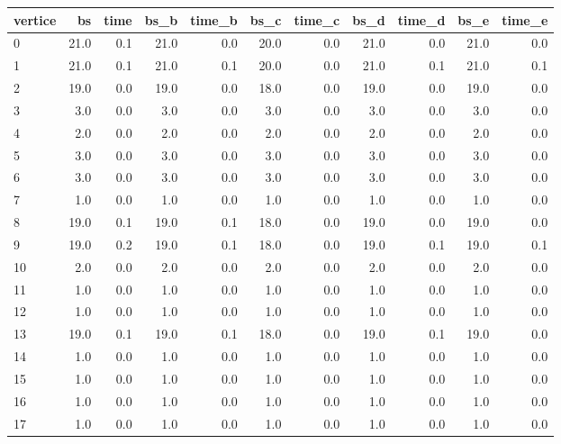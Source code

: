 \begin{tabular}{lrrrrrrrrrr}
\toprule
vertice &    bs &  time &  bs\_b &  time\_b &  bs\_c &  time\_c &  bs\_d &  time\_d &  bs\_e &  time\_e \\
\midrule
      0 &  21.0 &   0.1 &  21.0 &     0.0 &  20.0 &     0.0 &  21.0 &     0.0 &  21.0 &     0.0 \\
      1 &  21.0 &   0.1 &  21.0 &     0.1 &  20.0 &     0.0 &  21.0 &     0.1 &  21.0 &     0.1 \\
      2 &  19.0 &   0.0 &  19.0 &     0.0 &  18.0 &     0.0 &  19.0 &     0.0 &  19.0 &     0.0 \\
      3 &   3.0 &   0.0 &   3.0 &     0.0 &   3.0 &     0.0 &   3.0 &     0.0 &   3.0 &     0.0 \\
      4 &   2.0 &   0.0 &   2.0 &     0.0 &   2.0 &     0.0 &   2.0 &     0.0 &   2.0 &     0.0 \\
      5 &   3.0 &   0.0 &   3.0 &     0.0 &   3.0 &     0.0 &   3.0 &     0.0 &   3.0 &     0.0 \\
      6 &   3.0 &   0.0 &   3.0 &     0.0 &   3.0 &     0.0 &   3.0 &     0.0 &   3.0 &     0.0 \\
      7 &   1.0 &   0.0 &   1.0 &     0.0 &   1.0 &     0.0 &   1.0 &     0.0 &   1.0 &     0.0 \\
      8 &  19.0 &   0.1 &  19.0 &     0.1 &  18.0 &     0.0 &  19.0 &     0.0 &  19.0 &     0.0 \\
      9 &  19.0 &   0.2 &  19.0 &     0.1 &  18.0 &     0.0 &  19.0 &     0.1 &  19.0 &     0.1 \\
     10 &   2.0 &   0.0 &   2.0 &     0.0 &   2.0 &     0.0 &   2.0 &     0.0 &   2.0 &     0.0 \\
     11 &   1.0 &   0.0 &   1.0 &     0.0 &   1.0 &     0.0 &   1.0 &     0.0 &   1.0 &     0.0 \\
     12 &   1.0 &   0.0 &   1.0 &     0.0 &   1.0 &     0.0 &   1.0 &     0.0 &   1.0 &     0.0 \\
     13 &  19.0 &   0.1 &  19.0 &     0.1 &  18.0 &     0.0 &  19.0 &     0.1 &  19.0 &     0.0 \\
     14 &   1.0 &   0.0 &   1.0 &     0.0 &   1.0 &     0.0 &   1.0 &     0.0 &   1.0 &     0.0 \\
     15 &   1.0 &   0.0 &   1.0 &     0.0 &   1.0 &     0.0 &   1.0 &     0.0 &   1.0 &     0.0 \\
     16 &   1.0 &   0.0 &   1.0 &     0.0 &   1.0 &     0.0 &   1.0 &     0.0 &   1.0 &     0.0 \\
     17 &   1.0 &   0.0 &   1.0 &     0.0 &   1.0 &     0.0 &   1.0 &     0.0 &   1.0 &     0.0 \\

\end{tabular}
